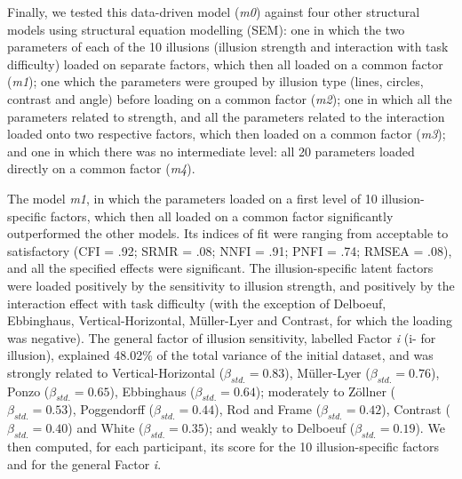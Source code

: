 \documentclass[
  man,floatsintext]{apa6}
\begin{document}
Finally, we tested this data-driven model (\emph{m0}) against four other structural models using structural equation modelling (SEM): one in which the two parameters of each of the 10 illusions (illusion strength and interaction with task difficulty) loaded on separate factors, which then all loaded on a common factor (\emph{m1}); one which the parameters were grouped by illusion type (lines, circles, contrast and angle) before loading on a common factor (\emph{m2}); one in which all the parameters related to strength, and all the parameters related to the interaction loaded onto two respective factors, which then loaded on a common factor (\emph{m3}); and one in which there was no intermediate level: all 20 parameters loaded directly on a common factor (\emph{m4}).

The model \emph{m1}, in which the parameters loaded on a first level of 10 illusion-specific factors, which then all loaded on a common factor significantly outperformed the other models. Its indices of fit were ranging from acceptable to satisfactory (CFI = .92; SRMR = .08; NNFI = .91; PNFI = .74; RMSEA = .08), and all the specified effects were significant. The illusion-specific latent factors were loaded positively by the sensitivity to illusion strength, and positively by the interaction effect with task difficulty (with the exception of Delboeuf, Ebbinghaus, Vertical-Horizontal, Müller-Lyer and Contrast, for which the loading was negative). The general factor of illusion sensitivity, labelled Factor \emph{i} (i- for illusion), explained 48.02\% of the total variance of the initial dataset, and was strongly related to Vertical-Horizontal (\(\beta_{std.}=0.83\)), Müller-Lyer (\(\beta_{std.}=0.76\)), Ponzo (\(\beta_{std.}=0.65\)), Ebbinghaus (\(\beta_{std.}=0.64\)); moderately to Zöllner (\(\beta_{std.}=0.53\)), Poggendorff (\(\beta_{std.}=0.44\)), Rod and Frame (\(\beta_{std.}=0.42\)), Contrast (\(\beta_{std.}=0.40\)) and White (\(\beta_{std.}=0.35\)); and weakly to Delboeuf (\(\beta_{std.}=0.19\)). We then computed, for each participant, its score for the 10 illusion-specific factors and for the general Factor \emph{i}.
\end{document}
